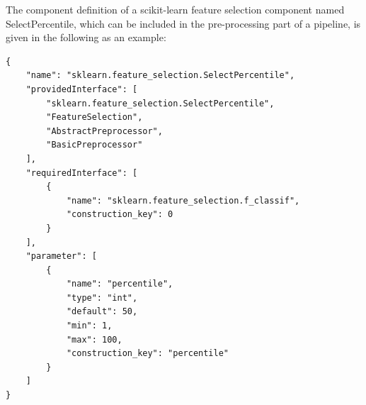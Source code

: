 The component definition of a scikit-learn feature selection component named SelectPercentile, which can be included in the pre-processing part of a pipeline, is given in the following as an example:
\begin{verbatim}
{
    "name": "sklearn.feature_selection.SelectPercentile",
    "providedInterface": [
        "sklearn.feature_selection.SelectPercentile",
        "FeatureSelection",
        "AbstractPreprocessor",
        "BasicPreprocessor"
    ],
    "requiredInterface": [
        {
            "name": "sklearn.feature_selection.f_classif",
            "construction_key": 0
        }
    ],
    "parameter": [
        {
            "name": "percentile",
            "type": "int",
            "default": 50,
            "min": 1,
            "max": 100,
            "construction_key": "percentile"
        }
    ]
}
\end{verbatim}
